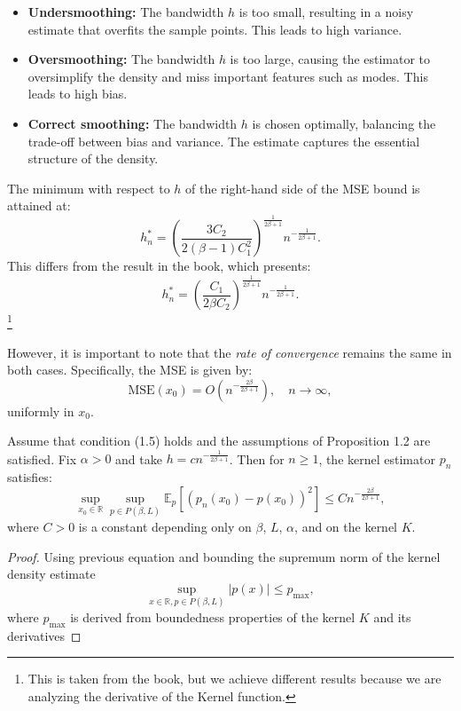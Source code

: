 \documentclass{article}
\begin{document}
\begin{itemize}
    \item \textbf{Undersmoothing:} The bandwidth $h$ is too small, resulting in a noisy estimate that overfits the sample points. This leads to high variance.
    \item \textbf{Oversmoothing:} The bandwidth $h$ is too large, causing the estimator to oversimplify the density and miss important features such as modes. This leads to high bias.
    \item \textbf{Correct smoothing:} The bandwidth $h$ is chosen optimally, balancing the trade-off between bias and variance. The estimate captures the essential structure of the density.
\end{itemize}


The minimum with respect to \( h \) of the right-hand side of the MSE bound is attained at:
\[
    h_n^* = \left( \frac{3C_2}{2(\beta - 1)C_1^2} \right)^{\frac{1}{2\beta + 1}} n^{-\frac{1}{2\beta + 1}}.
\]
This differs from the result in the book, which presents:
\[
    h_n^* = \left( \frac{C_1}{2\beta C_2} \right)^{\frac{1}{2\beta+1}} n^{-\frac{1}{2\beta+1}}.
\]
\footnote{This is taken from the book, but we achieve different results because we are analyzing the derivative of the Kernel function.}

However, it is important to note that the \textit{rate of convergence} remains the same in both cases. Specifically, the MSE is given by:
\[
    \text{MSE}(x_0) = O\left(n^{-\frac{2\beta}{2\beta+1}}\right), \quad n \to \infty,
\]
uniformly in \( x_0 \).
\begin{theorem}
    Assume that condition (1.5) holds and the assumptions of Proposition 1.2 are satisfied. Fix $\alpha > 0$ and take $h = cn^{-\frac{1}{2\beta+1}}$. Then for $n \geq 1$, the kernel estimator $p_n$ satisfies:
    \[
        \sup_{x_0 \in \mathbb{R}} \sup_{p \in P(\beta, L)} \mathbb{E}_p\left[(p_n(x_0) - p(x_0))^2\right] \leq C n^{-\frac{2\beta}{2\beta+1}},
    \]
    where $C > 0$ is a constant depending only on $\beta$, $L$, $\alpha$, and on the kernel $K$.
\end{theorem}

\begin{proof} Using previous equation and bounding the supremum norm of the kernel density estimate
    \[
    \sup_{x \in \mathbb{R}, p \in P(\beta, L)} |p(x)| \leq p_{\max},
\]
where $p_{\max}$ is derived from boundedness properties of the kernel $K$ and its derivatives
\end{proof}
\end{document}
